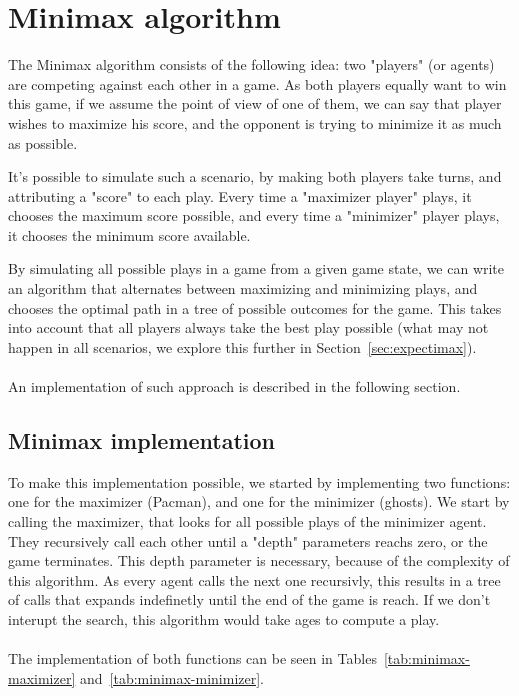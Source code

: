 \documentclass{article}
\begin{document}
\hfill\break
\pagebreak
\section{Minimax algorithm}

The Minimax algorithm consists of the following idea: two "players" (or agents) are competing against each other in a game. As both players equally want to win this game, if we assume the point of view of one of them, we can say that player wishes to maximize his score, and the opponent is trying to minimize it as much as possible.

It's possible to simulate such a scenario, by making both players take turns, and attributing a "score" to each play. Every time a "maximizer player" plays, it chooses the maximum score possible, and every time a "minimizer" player plays, it chooses the minimum score available.

By simulating all possible plays in a game from a given game state, we can write an algorithm that alternates between maximizing and minimizing plays, and chooses the optimal path in a tree of possible outcomes for the game. This takes into account that all players always take the best play possible (what may not happen in all scenarios, we explore this further in Section~\ref{sec:expectimax}).
~\\
~\\
An implementation of such approach is described in the following section.

\subsection{Minimax implementation}

To make this implementation possible, we started by implementing two functions: one for the maximizer (Pacman), and one for the minimizer (ghosts). We start by calling the maximizer, that looks for all possible plays of the minimizer agent. They recursively call each other until a "depth" parameters reachs zero, or the game terminates. This depth parameter is necessary, because of the complexity of this algorithm. As every agent calls the next one recursivly, this results in a tree of calls that expands indefinetly until the end of the game is reach. If we don't interupt the search, this algorithm would take ages to compute a play.
~\\
~\\
The implementation of both functions can be seen in Tables~\ref{tab:minimax-maximizer} and~\ref{tab:minimax-minimizer}.
\end{document}
